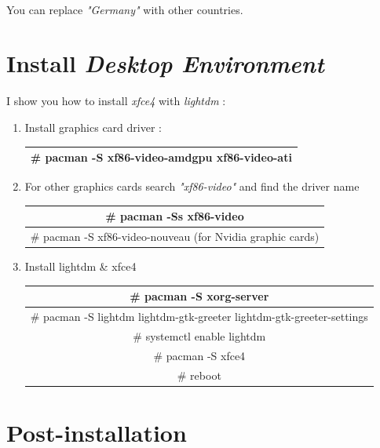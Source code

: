 \documentclass[12pt, a4paper]{article}
\begin{document}
\paragraph{}
You can replace \emph{"Germany"} with other countries.

\section{Install \emph{Desktop Environment}}
I show you how to install \emph{xfce4} with \emph{lightdm} :
\begin{enumerate}
	\item Install graphics card driver :
	\begin{center}
		\begin{tabular}{|c|} \hline
			\# pacman -S xf86-video-amdgpu xf86-video-ati\\ \hline
		\end{tabular}
	\end{center}

	\item For other graphics cards search \emph{"xf86-video"} and find the driver name
\begin{center}
	\begin{tabular}{|c|} \hline
		\# pacman -Ss xf86-video\\ \hline
		\# pacman -S xf86-video-nouveau (for Nvidia graphic cards)\\ \hline
	\end{tabular}
\end{center}

	\item Install lightdm \& xfce4
\begin{center}
	\begin{tabular}{|c|} \hline
		\# pacman -S xorg-server\\ \hline
		\# pacman -S lightdm lightdm-gtk-greeter lightdm-gtk-greeter-settings\\ \hline
		\# systemctl enable lightdm\\ \hline
		\# pacman -S xfce4\\ \hline
		\# reboot\\ \hline
	\end{tabular}
\end{center}
\end{enumerate}

\newpage
\section{Post-installation}
\end{document}
